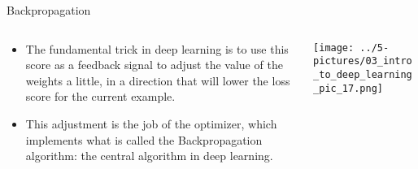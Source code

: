 \documentclass[11pt]{beamer}
\begin{document}
\begin{frame}{Backpropagation}
\begin{columns}[T] %
\begin{column}{.48\textwidth}
        \begin{itemize}
		\item The fundamental trick in deep learning is to use this score as a feedback signal to adjust the value of the weights a little, in a direction that will lower the loss score for the current example. 
		\item This adjustment is the job of the optimizer, which implements what is called the Backpropagation algorithm: the central algorithm in deep learning.
        \end{itemize}
\end{column}%
\hfill%
\begin{column}{.48\textwidth}
        \texttt{[image: ../5-pictures/03\_intro\_to\_deep\_learning\_pic\_17.png]}
\end{column}%
\end{columns}
\end{frame}
\end{document}
